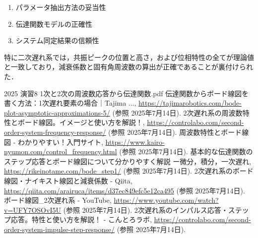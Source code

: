 \documentclass[11pt,a4paper]{ltjsarticle}
\begin{document}
\begin{enumerate}
    \item パラメータ抽出方法の妥当性
    \item 伝達関数モデルの正確性  
    \item システム同定結果の信頼性
\end{enumerate}

特に二次遅れ系では，共振ピークの位置と高さ，および位相特性の全てが理論値と一致しており，減衰係数と固有角周波数の算出が正確であることが裏付けられた．

\begin{thebibliography}{9}
     2025 演習8 1次と2次の周波数応答から伝達関数.pdf
     伝達関数からボード線図を書く方法：1次遅れ要素の場合｜Tajima ..., \url{https://tajimarobotics.com/bode-plot-asymptotic-approximations-5/} (参照 2025年7月14日).
     2次遅れ系の周波数特性とボード線図。イメージと使い方を解説！, \url{https://controlabo.com/second-order-system-frequency-response/} (参照 2025年7月14日).
     周波数特性とボード線図 - わかりやすい！入門サイト, \url{https://www.kairo-nyumon.com/control_frequency.html} (参照 2025年7月14日).
     基本的な伝達関数のステップ応答とボード線図について分かりやすく解説 ー微分，積分，一次遅れ, \url{https://rikeinotame.com/bode_step1/} (参照 2025年7月14日).
     2次遅れ系のボード線図・ナイキスト線図と減衰係数 - Qiita, \url{https://qiita.com/arairuca/items/d37ec849efc5e12ca495} (参照 2025年7月14日).
     ボード線図\_2次遅れ系 - YouTube, \url{https://www.youtube.com/watch?v=UFY7OSOvI5U} (参照 2025年7月14日).
     2次遅れ系のインパルス応答・ステップ応答。特性と使い方を解説！ - こんとろラボ, \url{https://controlabo.com/second-order-system-impulse-step-response/} (参照 2025年7月14日).
\end{thebibliography}
\end{document}
